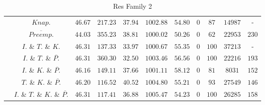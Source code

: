 \documentclass{article}
\begin{document}
\begin{table}[!htb]
{\begin{tabular}{|c|c|c|cc|cccccc|}
                             & $Knap.$  & $46.67$ & $217.23$ & $37.94$ & $1002.88$ & $54.80$ & $0$ & $87$ & $14987$ & - \\ 
                             & $\overline{Preemp.}$&$44.03$ & $355.23$ & $38.81$ & $1000.02$ & $50.26$ & $0$ & $62$ & $22953$ & $230 $ \\ 
                             & $I.$ \& $T.$ \& $K.$ &$46.31$ & $137.33$ & $33.97$ & $1000.67$ & $55.35$ & $0$ & $100$ & $37213$ & - \\ 
                             & $I.$ \& $T.$ \& $\overline{P.}$  &$46.31$ & $360.30$ & $32.50$ & $1003.46$ & $56.56$ & $0$ & $100$ & $22216$ & $193 $ \\ 
                             & $I.$ \& $K.$ \& $\overline{P.}$  &$46.16$ & $149.11$ & $37.66$ & $1001.11$ & $58.12$ & $0$ & $81$ & $8031$ & $152 $ \\ 
                             & $T.$ \& $K.$ \& $\overline{P.}$  &$46.20$ & $116.52$ & $40.52$ & $1004.80$ & $55.21$ & $0$ & $93$ & $27549$ & $146 $ \\ 
                             & $I.$ \& $T.$ \& $K.$ \& $\overline{P.}$  &$46.31$ & $117.41$ & $36.88$ & $1005.47$ & $54.23$ & $0$ & $100$ & $26285$ & $158 $ \\ 
    \hline
  \end{tabular}}
\caption{Res Family 2}
\end{table}
\newpage
\end{document}

